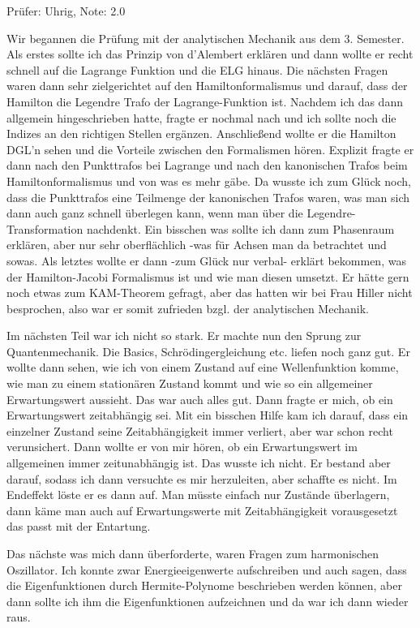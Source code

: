 Prüfer: Uhrig, Note: 2.0

Wir begannen die Prüfung mit der analytischen Mechanik aus dem 3. Semester. 
Als erstes sollte ich das Prinzip von d'Alembert erklären und dann wollte er recht schnell auf die Lagrange Funktion und die ELG hinaus. 
Die nächsten Fragen waren dann sehr zielgerichtet auf den Hamiltonformalismus und darauf, dass der Hamilton die Legendre Trafo der Lagrange-Funktion ist.
Nachdem ich das dann allgemein hingeschrieben hatte, fragte er nochmal nach und ich sollte noch die Indizes an den richtigen Stellen ergänzen. 
Anschließend wollte er die Hamilton DGL'n sehen und die Vorteile zwischen den Formalismen hören. Explizit fragte er dann nach den Punkttrafos bei Lagrange und nach den kanonischen Trafos beim Hamiltonformalismus und von was es mehr gäbe. Da wusste ich zum Glück noch, dass die Punkttrafos eine Teilmenge der kanonischen Trafos waren, was man sich dann auch ganz schnell überlegen kann, wenn man über die Legendre-Transformation nachdenkt. 
Ein bisschen was sollte ich dann zum Phasenraum erklären, aber nur sehr oberflächlich -was für Achsen man da betrachtet und sowas. 
Als letztes wollte er dann -zum Glück nur verbal- erklärt bekommen, was der Hamilton-Jacobi Formalismus ist und wie man diesen umsetzt. 
Er hätte gern noch etwas zum KAM-Theorem gefragt, aber das hatten wir bei Frau Hiller nicht besprochen, also war er somit zufrieden bzgl. der analytischen Mechanik.

Im nächsten Teil war ich nicht so stark. Er machte nun den Sprung zur Quantenmechanik. Die Basics, Schrödingergleichung etc. liefen noch ganz gut. Er wollte dann sehen, wie ich von einem Zustand auf eine Wellenfunktion komme, wie man zu einem stationären Zustand kommt und wie so ein allgemeiner Erwartungswert aussieht. Das war auch alles gut. 
Dann fragte er mich, ob ein Erwartungswert zeitabhängig sei. Mit ein bisschen Hilfe kam ich darauf, dass ein einzelner Zustand seine Zeitabhängigkeit immer verliert, aber war schon recht verunsichert. Dann wollte er von mir hören, ob ein Erwartungswert im allgemeinen immer zeitunabhängig ist. Das wusste ich nicht. Er bestand aber darauf, sodass ich dann versuchte es mir herzuleiten, aber schaffte es nicht. Im Endeffekt löste er es dann auf. Man müsste einfach nur Zustände überlagern, dann käme man auch auf Erwartungswerte mit Zeitabhängigkeit vorausgesetzt das passt mit der Entartung.

Das nächste was mich dann überforderte, waren Fragen zum harmonischen Oszillator. Ich konnte zwar Energieeigenwerte aufschreiben und auch sagen, dass die Eigenfunktionen durch Hermite-Polynome beschrieben werden können, aber dann sollte ich ihm die Eigenfunktionen aufzeichnen und da war ich dann wieder raus. 

